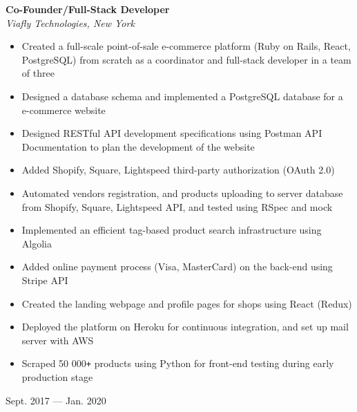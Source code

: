 \documentclass[9pt]{extarticle}
\begin{document}
\begin{minipage}[t]{0.8\linewidth}
\begin{flushleft}
\textbf{Co-Founder/Full-Stack Developer}\\
\textit{Viafly Technologies, New York}
\begin{itemize}
	\item Created a full-scale point-of-sale e-commerce platform
		(Ruby on Rails, React, PostgreSQL)
		from scratch as a coordinator and full-stack developer
		in a team of three
	\item Designed a database schema and implemented a PostgreSQL database
		for a e-commerce website
	\item Designed RESTful API development specifications using
		Postman API Documentation to plan the
		development of the website
	\item Added Shopify, Square, Lightspeed third-party authorization (OAuth 2.0)
	\item
		Automated vendors registration, and products uploading
		to server database from Shopify, Square, Lightspeed API,
		and tested using RSpec and mock
	\item Implemented an efficient tag-based product search infrastructure
		using Algolia
	\item Added online payment process (Visa, MasterCard)
		on  the back-end using Stripe API
	\item Created the landing webpage
		and profile pages for shops using React (Redux)
	\item Deployed the platform on Heroku for continuous integration,
		and set up mail server with AWS
	\item Scraped 50 000\texttt{+} products using Python
		for front-end testing during early production stage
\end{itemize}
\end{flushleft}
\end{minipage}
\begin{minipage}[t]{0.19\linewidth}
\begin{flushright}
Sept. 2017 --- Jan. 2020
\end{flushright}
\end{minipage}

\vfill
\end{document}
